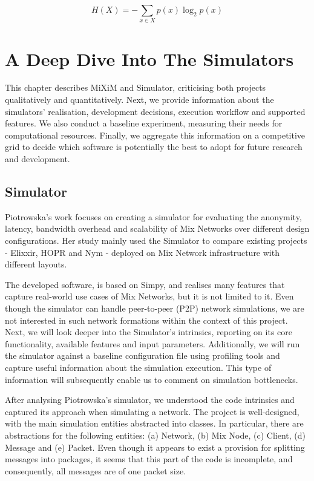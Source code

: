 \documentclass[logo,msc,cyber]{infthesis}   %
\begin{document}
\begin{equation}
    \label{eq:entropy}
    H(X) = -\sum_{x \in X} p(x) \log_2p(x)     
\end{equation}

\chapter{A Deep Dive Into The Simulators}

This chapter describes MiXiM and Simulator, criticising both projects
qualitatively and quantitatively. Next, we provide information about the
simulators' realisation, development decisions, execution workflow and supported
features. We also conduct a baseline experiment, measuring their needs for
computational resources. Finally, we aggregate this information on a competitive
grid to decide which software is potentially the best to adopt for future
research and development. 

\section{Simulator}
Piotrowska's work\cite{simulator} focuses on creating a simulator for evaluating
the anonymity, latency, bandwidth overhead and scalability of Mix Networks over
different design configurations. Her study mainly used the Simulator to compare
existing projects - Elixxir\cite{xx-netowrk}, HOPR\cite{hopr} and Nym\cite{nym-tech}
- deployed on Mix Network infrastructure with different layouts.

The developed software, is based on Simpy\cite{simpy}, and realises many
features that capture real-world use cases of Mix Networks, but it is not
limited to it. Even though the simulator can handle peer-to-peer (P2P) network
simulations, we are not interested in such network formations within the context
of this project. Next, we will look deeper into the Simulator's intrinsics,
reporting on its core functionality, available features and input parameters.
Additionally, we will run the simulator against a baseline configuration file
using profiling tools\cite{cProfile,memprofiler} and capture useful information
about the simulation execution. This type of information will subsequently
enable us to comment on simulation bottlenecks.

After analysing Piotrowska's simulator, we understood the code intrinsics and
captured its approach when simulating a network. The project is well-designed,
with the main simulation entities abstracted into classes. In particular, there
are abstractions for the following entities: (a) Network, (b) Mix Node, (c) Client,
(d) Message and (e) Packet. Even though it appears to exist a provision for
splitting messages into packages, it seems that this part of the code is
incomplete, and consequently, all messages are of one packet size.
\end{document}
